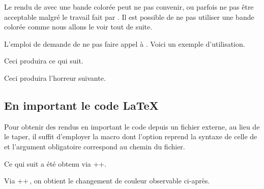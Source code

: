 Le rendu de  avec une bande colorée peut ne pas convenir, ou parfois ne pas être acceptable malgré le travail fait par .
Il est possible de ne pas utiliser une bande colorée comme nous allons le voir tout de suite.


\begin{tdocexa}
    L'emploi de  demande de ne pas faire appel à .
    Voici un exemple d'utilisation.



    Ceci produira ce qui suit.

    \medskip

    

\end{tdocexa}


\begin{tdocexa}
    \leavevmode



    Ceci produira l'horreur suivante.

    \medskip

    

\end{tdocexa}


\subsection{En important le code \LaTeX}

Pour obtenir des rendus en important le code depuis un fichier externe, au lieu de le taper, il suffit d'employer la macro  dont l'option reprend la syntaxe de celle de  et l'argument obligatoire correspond au chemin du fichier.


\begin{tdocexa}
    Ce qui suit a été obtenu via \tdoclatexin++.

    \medskip



    \medskip

    Via \tdoclatexin++\,, on obtient le changement de couleur observable ci-après.

    \medskip


\end{tdocexa}


